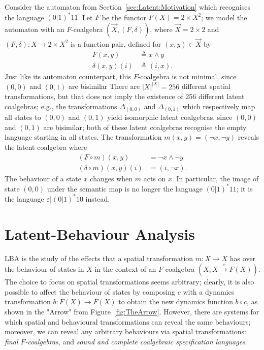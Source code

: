 \begin{example}
\label{ex:Latent:TheExample}
Consider the automaton from Section~\ref{sec:Latent:Motivation} which recognises the language $(0|1)^*11$. Let $F$ be the functor $F(X)=2\times X^2$; we model the automaton with an $F$-coalgebra $(\vec{X},(F,\delta))$, where $\vec{X}=2\times2$ and $(F,\delta)\colon X\rightarrow 2\times X^2$ is a function pair, defined for $(x,y)\in \vec{X}$ by
\begin{align}
    F(x,y)&\triangleq x \land y\\
    \delta(x,y)(i)&\triangleq (i,x).
\end{align}
Just like its automaton counterpart, this $F$-coalgebra is not minimal, since $(0,0)$ and $(0,1)$ are bisimilar
There are $|X|^{|X|}=256$ different spatial transformations, but that does not imply the existence of 256 different latent coalgebras; e.g., the transformations $\Delta_{(0,0)}$ and $\Delta_{(0,1)}$ which respectively map all states to $(0,0)$ and $(0,1)$ yield isomorphic latent coalgebras, since $(0,0)$ and $(0,1)$ are bisimilar; both of these latent coalgebras recognise the empty language starting in all states. 
The transformation $m(x,y)=(\lnot x,\lnot y)$ reveals the latent coalgebra where 
\begin{align}
    (F\circ m)(x,y)&= \lnot x \land \lnot y\\
    (\delta\circ m)(x,y)(i)&= (i,\lnot x).
\end{align}
The behaviour of a state $x$ changes when $m$ acts on $x$. In particular, the image of state $(0,0)$ under the semantic map is no longer the language $(0|1)^*11$; it is the language $\varepsilon|(0|1)^*10$ instead.
\end{example}
\section{Latent-Behaviour Analysis}
LBA is the study of the effects that a spatial transformation $m\colon X\rightarrow X$ has over the behaviour of states in $X$ in the context of an $F$-coalgebra $(X,X\xrightarrow{c} F(X))$. The choice to focus on spatial transformations seems arbitrary; clearly, it is also possible to affect the behaviour of states by composing $c$ with a {dynamics transformation} $b\colon F(X)\rightarrow F(X)$ to obtain the new dynamics function $b \circ c$, as shown in the "Arrow" from Figure~\ref{fig:TheArrow}. %
However, there are systems for which spatial and behavioural transformations can reveal the same behaviours; moreover, we can reveal any arbitrary behaviours via spatial transformations: \emph{final $F$-coalgebras}, and \emph{sound and complete coalgebraic specification languages}.

